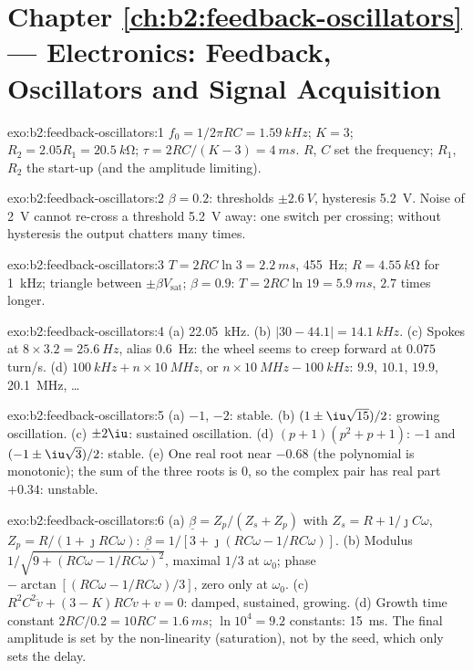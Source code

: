 \section*{Chapter \ref{ch:b2:feedback-oscillators} --- Electronics: Feedback, Oscillators and Signal Acquisition}

\begin{solution}{exo:b2:feedback-oscillators:1}
$f_0 = 1/2\pi RC = \qty{1.59}{kHz}$; $K = 3$; $R_2 = 2.05R_1 = \qty{20.5}{k\ohm}$;
$\tau = 2RC/(K - 3) = \qty{4}{ms}$. $R$, $C$ set the frequency; $R_1$, $R_2$ the
start-up (and the amplitude limiting).
\end{solution}

\begin{solution}{exo:b2:feedback-oscillators:2}
$\beta = 0.2$: thresholds $\pm\qty{2.6}{V}$, hysteresis \qty{5.2}{V}. Noise of
\qty{2}{V} cannot re-cross a threshold \qty{5.2}{V} away: one switch per
crossing; without hysteresis the output chatters many times.
\end{solution}

\begin{solution}{exo:b2:feedback-oscillators:3}
$T = 2RC\ln3 = \qty{2.2}{ms}$, \qty{455}{Hz}; $R = \qty{4.55}{k\ohm}$ for \qty{1}{kHz};
triangle between $\pm\beta V_{\text{sat}}$; $\beta = 0.9$: $T = 2RC\ln19 = \qty{5.9}{ms}$,
$2.7$ times longer.
\end{solution}

\begin{solution}{exo:b2:feedback-oscillators:4}
(a) \qty{22.05}{kHz}. (b) $|30 - 44.1| = \qty{14.1}{kHz}$. (c) Spokes at $8 \times 3.2 =
\qty{25.6}{Hz}$, alias \qty{0.6}{Hz}: the wheel seems to creep forward at
$0.075$ turn/s. (d) $\qty{100}{kHz} + n \times \qty{10}{MHz}$, or $n \times \qty{10}{MHz} -
\qty{100}{kHz}$: $9.9$, $10.1$, $19.9$, \qty{20.1}{MHz}, \dots
\end{solution}

\begin{solution}{exo:b2:feedback-oscillators:5}
(a) $-1$, $-2$: stable. (b) $(1 \pm \iu\sqrt{15})/2$: growing oscillation.
(c) $\pm2\iu$: sustained oscillation. (d) $(p + 1)(p^2 + p + 1)$: $-1$ and
$(-1 \pm \iu\sqrt3)/2$: stable. (e) One real root near $-0.68$ (the
polynomial is monotonic); the sum of the three roots is $0$, so the
complex pair has real part $+0.34$: unstable.
\end{solution}

\begin{solution}{exo:b2:feedback-oscillators:6}
(a) $\underline\beta = Z_p/(Z_s + Z_p)$ with $Z_s = R + 1/\jmath C\omega$, $Z_p = R/(1 +
\jmath RC\omega)$: $\underline\beta = 1/[3 + \jmath(RC\omega - 1/RC\omega)]$. (b) Modulus
$1/\sqrt{9 + (RC\omega - 1/RC\omega)^2}$, maximal $1/3$ at $\omega_0$; phase $-\arctan
[(RC\omega - 1/RC\omega)/3]$, zero only at $\omega_0$. (c) $R^2C^2\ddot v + (3 - K)RC
\dot v + v = 0$: damped, sustained, growing. (d) Growth time constant
$2RC/0.2 = 10RC = \qty{1.6}{ms}$; $\ln10^4 = 9.2$ constants: \qty{15}{ms}. The
final amplitude is set by the non-linearity (saturation), not by the
seed, which only sets the delay.
\end{solution}

